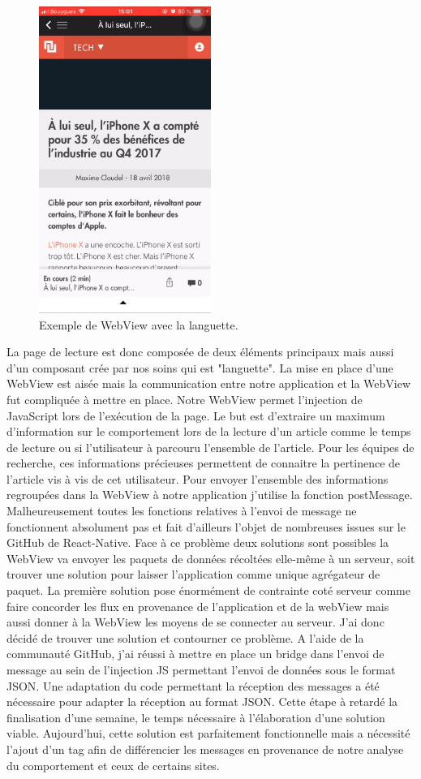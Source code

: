 \begin{figure}[htp]
  \centering
  \includegraphics[height=10cm]{images/webview}
  \caption{Exemple de WebView avec la languette.}
  \label{fig:screen-wv}
\end{figure}

La page de lecture est donc composée de deux éléments principaux mais aussi d'un composant crée par nos soins qui est "languette". La mise en place d'une WebView est aisée mais la communication entre notre application et la WebView fut compliquée à mettre en place. Notre WebView permet l'injection de JavaScript lors de l'exécution de la page. Le but est d'extraire un maximum d'information sur le comportement lors de la lecture d'un article comme le temps de lecture ou si l'utilisateur à parcouru l'ensemble de l'article. Pour les équipes de recherche, ces informations précieuses permettent de connaitre la pertinence de l'article vis à vis de cet utilisateur. Pour envoyer l'ensemble des informations regroupées dans la WebView à notre application j'utilise la fonction postMessage. Malheureusement toutes les fonctions relatives à l'envoi de message ne fonctionnent absolument pas et fait d'ailleurs l'objet de nombreuses issues sur le GitHub de React-Native. Face à ce problème deux solutions sont possibles la WebView va envoyer les paquets de données récoltées elle-même à un serveur, soit trouver une solution pour laisser l'application comme unique agrégateur de paquet. La première solution pose énormément de contrainte coté serveur comme faire concorder les flux en provenance de l'application et de la webView mais aussi donner à la WebView les moyens de se connecter au serveur. J'ai donc décidé de trouver une solution et contourner ce problème. A l'aide de la communauté GitHub, j'ai réussi à mettre en place un bridge dans l'envoi de message au sein de l'injection JS permettant l'envoi de données sous le format JSON. Une adaptation du code permettant la réception des messages a été nécessaire pour adapter la réception au format JSON. Cette étape à retardé la finalisation d'une semaine, le temps nécessaire à l'élaboration d'une solution viable. Aujourd'hui, cette solution est parfaitement fonctionnelle mais a nécessité l'ajout d'un tag afin de différencier les messages en provenance de notre analyse du comportement et ceux de certains sites.




